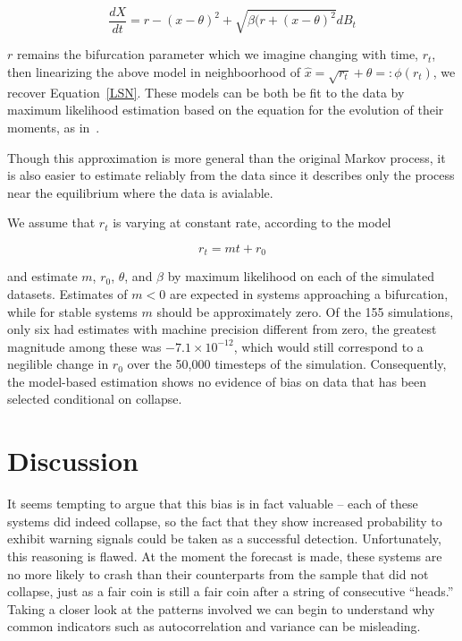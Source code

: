 \documentclass[authoryear,review,12pt]{elsarticle}
\begin{document}
\begin{equation}
  \frac{dX}{dt} = r - (x-\theta)^2 + \sqrt{ \beta (r + (x-\theta)^2 } dB_t
\end{equation}

$r$ remains the bifurcation parameter which we imagine changing with time,
$r_t$, then linearizing the above model in neighboorhood of
\(\hat x = \sqrt{r_t} +\theta =: \phi(r_t)\), we recover Equation~\eqref{LSN}.
These models can be both be fit to the data by maximum likelihood estimation
based on the equation for the evolution of their moments, as
in~\citet{Boettiger2012b}.  

Though this approximation is more general than the original Markov process,
it is also easier to estimate reliably from the data since it describes only 
the process near the equilibrium where the data is avialable.  

We assume that $r_t$ is varying at constant rate, according to the model

\begin{equation}
 r_t = m t + r_0 
\end{equation}

and estimate $m$, $r_0$, $\theta$, and $\beta$ by maximum likelihood on each
of the simulated datasets.  Estimates of $m < 0 $ are expected in systems 
approaching a bifurcation, while for stable systems $m$ should be approximately zero.
Of the 155 simulations, only six had estimates with machine precision different
from zero, the greatest magnitude among these was $-7.1 \times 10^{-12}$,
which would still correspond to a negilible change in $r_0$ over the 50,000 timesteps
of the simulation.  Consequently, the model-based estimation shows no 
evidence of bias on data that has been selected conditional on collapse.   

 \section{Discussion}

 
It seems tempting to argue that this bias is in fact valuable -- each
of these systems did indeed collapse, so the fact that they show increased 
probability to exhibit warning signals could be taken as a successful detection.
Unfortunately, this reasoning is flawed. At the moment the forecast is made,
these systems are no more likely to crash than their counterparts from the sample
that did not collapse, just as a fair coin is still a fair coin after a string of
consecutive ``heads.''  Taking a closer look at the patterns involved we can
begin to understand why common indicators such as autocorrelation and variance
can be misleading.
\end{document}
